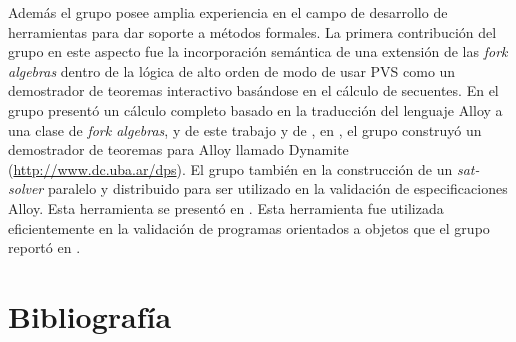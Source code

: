 \documentclass[a4paper, 11pt]{article}
\begin{document}
Además el grupo posee amplia experiencia en el campo de desarrollo de herramientas para dar soporte a métodos formales. La primera contribución del grupo en este aspecto \cite{lopezpombo:SRI-CSL-02-04} fue la incorporación semántica de una extensión de las \emph{fork algebras} dentro de la lógica de alto orden de modo de usar PVS \cite{owre:cade92} como un demostrador de teoremas interactivo basándose en el cálculo de secuentes. En \cite{frias:icfem04} el grupo presentó un cálculo completo basado en la traducción del lenguaje {\sf Alloy} a una clase de \emph{fork algebras}, y de este trabajo y de \cite{lopezpombo:SRI-CSL-02-04}, en \cite{frias:tacas07}, el grupo construyó un demostrador de teoremas para {\sf Alloy} llamado Dynamite (\url{http://www.dc.uba.ar/dps}). El grupo también en la construcción de un \emph{sat-solver} paralelo y distribuido para ser utilizado en la validación de especificaciones {\sf Alloy}. Esta herramienta se presentó en \cite{rosner:abz10}. Esta herramienta fue utilizada eficientemente en la validación de programas orientados a objetos que el grupo reportó en \cite{galeotti:apv09,galeotti:issta10}.

\section{Bibliografía}

\begin{small}


\end{small}
\end{document}
